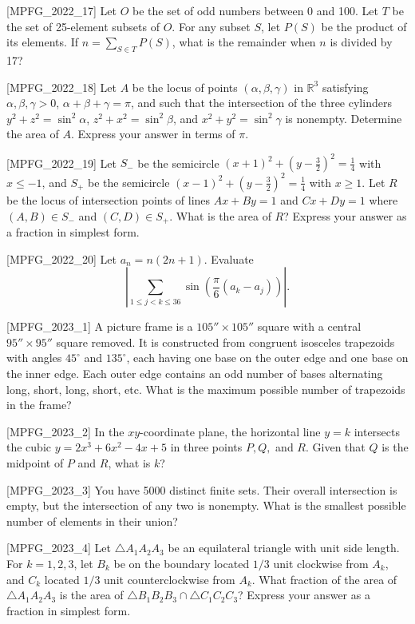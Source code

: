 [MPFG_2022_17]
Let $O$ be the set of odd numbers between 0 and 100. Let $T$ be the set of 25-element subsets of $O$. For any subset $S$, let $P(S)$ be the product of its elements. If $n = \sum_{S \in T} P(S)$, what is the remainder when $n$ is divided by 17?

[MPFG_2022_18]
Let $A$ be the locus of points $(\alpha, \beta, \gamma)$ in $\mathbb{R}^3$ satisfying $\alpha, \beta, \gamma > 0$, $\alpha + \beta + \gamma = \pi$, and such that the intersection of the three cylinders $y^2+z^2 = \sin^2\alpha$, $z^2+x^2 = \sin^2\beta$, and $x^2+y^2 = \sin^2\gamma$ is nonempty. Determine the area of $A$. Express your answer in terms of $\pi$.

[MPFG_2022_19]
Let $S_-$ be the semicircle $(x+1)^2 + (y-\frac{3}{2})^2 = \frac{1}{4}$ with $x \le -1$, and $S_+$ be the semicircle $(x-1)^2 + (y-\frac{3}{2})^2 = \frac{1}{4}$ with $x \ge 1$. Let $R$ be the locus of intersection points of lines $Ax+By=1$ and $Cx+Dy=1$ where $(A,B) \in S_-$ and $(C,D) \in S_+$. What is the area of $R$? Express your answer as a fraction in simplest form.

[MPFG_2022_20]
Let $a_n = n(2n+1)$. Evaluate
$$\left|\sum_{1 \le j < k \le 36} \sin\left(\frac{\pi}{6}(a_k - a_j)\right)\right|.$$

[MPFG_2023_1]
A picture frame is a $105'' \times 105''$ square with a central $95'' \times 95''$ square removed. It is constructed from congruent isosceles trapezoids with angles $45^\circ$ and $135^\circ$, each having one base on the outer edge and one base on the inner edge. Each outer edge contains an odd number of bases alternating long, short, long, short, etc. What is the maximum possible number of trapezoids in the frame?

[MPFG_2023_2]
In the $xy$-coordinate plane, the horizontal line $y=k$ intersects the cubic $y = 2x^3 + 6x^2 - 4x + 5$ in three points $P, Q,$ and $R$. Given that $Q$ is the midpoint of $P$ and $R$, what is $k$?

[MPFG_2023_3]
You have 5000 distinct finite sets. Their overall intersection is empty, but the intersection of any two is nonempty. What is the smallest possible number of elements in their union?

[MPFG_2023_4]
Let $\triangle A_1 A_2 A_3$ be an equilateral triangle with unit side length. For $k=1, 2, 3$, let $B_k$ be on the boundary located $1/3$ unit clockwise from $A_k$, and $C_k$ located $1/3$ unit counterclockwise from $A_k$. What fraction of the area of $\triangle A_1 A_2 A_3$ is the area of $\triangle B_1 B_2 B_3 \cap \triangle C_1 C_2 C_3$? Express your answer as a fraction in simplest form.

